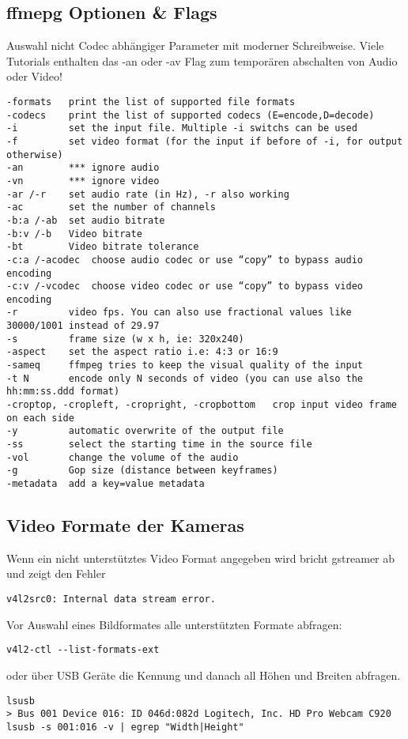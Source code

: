 \subsection{ffmepg Optionen \& Flags}
Auswahl nicht Codec abhängiger Parameter mit moderner Schreibweise. Viele Tutorials enthalten das -an oder -av Flag zum temporären abschalten von Audio oder Video!
\begin{verbatim}
-formats   print the list of supported file formats
-codecs    print the list of supported codecs (E=encode,D=decode)
-i         set the input file. Multiple -i switchs can be used
-f         set video format (for the input if before of -i, for output otherwise)
-an        *** ignore audio
-vn        *** ignore video
-ar /-r    set audio rate (in Hz), -r also working
-ac        set the number of channels
-b:a /-ab  set audio bitrate
-b:v /-b   Video bitrate
-bt        Video bitrate tolerance
-c:a /-acodec  choose audio codec or use “copy” to bypass audio encoding
-c:v /-vcodec  choose video codec or use “copy” to bypass video encoding
-r         video fps. You can also use fractional values like 30000/1001 instead of 29.97
-s         frame size (w x h, ie: 320x240)
-aspect    set the aspect ratio i.e: 4:3 or 16:9
-sameq     ffmpeg tries to keep the visual quality of the input
-t N       encode only N seconds of video (you can use also the hh:mm:ss.ddd format)
-croptop, -cropleft, -cropright, -cropbottom   crop input video frame on each side
-y         automatic overwrite of the output file
-ss        select the starting time in the source file
-vol       change the volume of the audio
-g         Gop size (distance between keyframes)
-metadata  add a key=value metadata
\end{verbatim}

\subsection{Video Formate der Kameras}
Wenn ein nicht unterstütztes Video Format angegeben wird bricht gstreamer ab und zeigt den Fehler
\begin{verbatim}
v4l2src0: Internal data stream error.
\end{verbatim}

Vor Auswahl eines Bildformates alle unterstützten Formate 
abfragen:
\begin{verbatim}
v4l2-ctl --list-formats-ext
\end{verbatim}

oder über USB Geräte die Kennung und danach all Höhen und Breiten abfragen.
\begin{verbatim}
lsusb
> Bus 001 Device 016: ID 046d:082d Logitech, Inc. HD Pro Webcam C920
lsusb -s 001:016 -v | egrep "Width|Height"
\end{verbatim}

